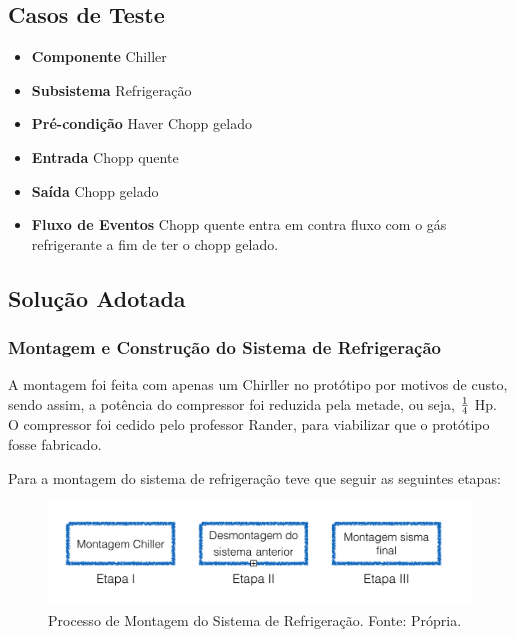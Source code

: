         \subsection[Casos de Teste]{Casos de Teste}
                \begin{itemize}
                    \item \textbf{Componente} Chiller
                    \item \textbf{Subsistema} Refrigeração
                    \item \textbf{Pré-condição} Haver Chopp gelado
                    \item \textbf{Entrada} Chopp quente
                    \item \textbf{Saída} Chopp gelado
                    \item \textbf{Fluxo de Eventos} Chopp quente entra em contra fluxo com o gás refrigerante a fim de
                        ter o chopp gelado.
                \end{itemize}

        \subsection[Solução Adotada]{Solução Adotada}
            \subsubsection[Montagem e Construção do Sistema de Refrigeração]{Montagem e Construção do Sistema de Refrigeração}
                A montagem foi feita com apenas um Chirller no protótipo por motivos de custo,
                sendo assim, a potência do compressor foi reduzida pela metade, ou seja, $1 \over 4$ Hp. O
                compressor foi cedido pelo professor Rander, para viabilizar que o protótipo fosse
                fabricado.
                
                Para a montagem do sistema de refrigeração teve que seguir as seguintes
                etapas:
                \begin{figure}[!htb]
            		\centering
            		\includegraphics[scale= 0.3]{figuras/montagem-chiler.png}
            		\caption{Processo de Montagem do Sistema de Refrigeração. Fonte: Própria.}
            		\label{simulacao-refrigeracao}
                \end{figure}
                
